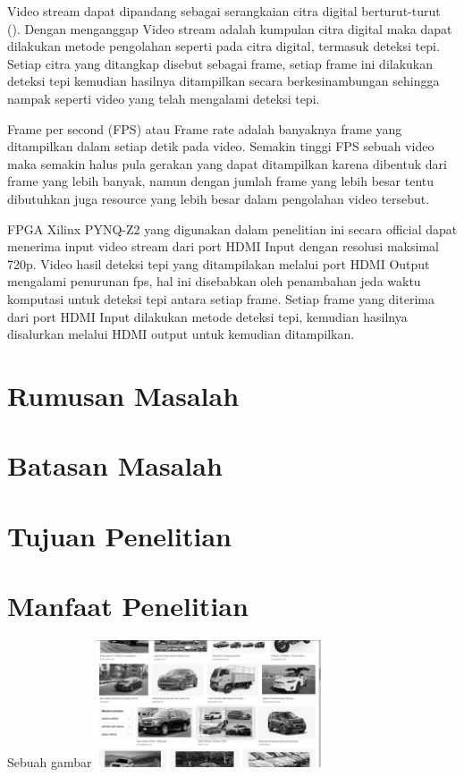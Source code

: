 Video stream dapat dipandang sebagai serangkaian citra digital berturut-turut (\cite{thesis:jin}). Dengan menganggap Video stream adalah kumpulan citra digital maka dapat dilakukan metode pengolahan seperti pada citra digital, termasuk deteksi tepi. Setiap citra yang ditangkap disebut sebagai frame, setiap frame ini dilakukan deteksi tepi kemudian hasilnya ditampilkan secara berkesinambungan sehingga nampak seperti video yang telah mengalami deteksi tepi. 

Frame per second (FPS) atau Frame rate adalah banyaknya frame yang ditampilkan dalam setiap detik pada video. Semakin tinggi FPS sebuah video maka semakin halus pula gerakan yang dapat ditampilkan karena dibentuk dari frame yang lebih banyak, namun dengan jumlah frame yang lebih besar tentu dibutuhkan juga resource yang lebih besar dalam pengolahan video tersebut.

FPGA Xilinx PYNQ-Z2 yang digunakan dalam penelitian ini secara official dapat menerima input video stream dari port HDMI Input dengan resolusi maksimal 720p. Video hasil deteksi tepi yang ditampilakan melalui port HDMI Output mengalami penurunan fps, hal ini disebabkan oleh penambahan jeda waktu komputasi untuk deteksi tepi antara setiap frame. Setiap frame yang diterima dari port HDMI Input dilakukan metode deteksi tepi, kemudian hasilnya disalurkan melalui HDMI output untuk kemudian ditampilkan.

\section{Rumusan Masalah}
\blindtext

\section{Batasan Masalah}
\blindtext

\section{Tujuan Penelitian}
\blindtext

\section{Manfaat Penelitian}
\blindtext




\begin{afigure}{Sebuah gambar}
    \label{fig:figure2}
    \includegraphics[width=0.5\textwidth, center]{images/input.png}
\end{afigure}

